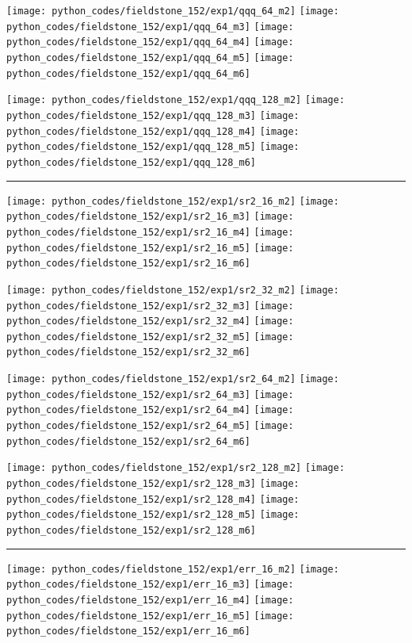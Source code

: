 \noindent
\texttt{[image: python\_codes/fieldstone\_152/exp1/qqq\_64\_m2]}
\texttt{[image: python\_codes/fieldstone\_152/exp1/qqq\_64\_m3]}
\texttt{[image: python\_codes/fieldstone\_152/exp1/qqq\_64\_m4]}
\texttt{[image: python\_codes/fieldstone\_152/exp1/qqq\_64\_m5]}
\texttt{[image: python\_codes/fieldstone\_152/exp1/qqq\_64\_m6]}

\noindent
\texttt{[image: python\_codes/fieldstone\_152/exp1/qqq\_128\_m2]}
\texttt{[image: python\_codes/fieldstone\_152/exp1/qqq\_128\_m3]}
\texttt{[image: python\_codes/fieldstone\_152/exp1/qqq\_128\_m4]}
\texttt{[image: python\_codes/fieldstone\_152/exp1/qqq\_128\_m5]}
\texttt{[image: python\_codes/fieldstone\_152/exp1/qqq\_128\_m6]}

\hrule

\noindent
\texttt{[image: python\_codes/fieldstone\_152/exp1/sr2\_16\_m2]}
\texttt{[image: python\_codes/fieldstone\_152/exp1/sr2\_16\_m3]}
\texttt{[image: python\_codes/fieldstone\_152/exp1/sr2\_16\_m4]}
\texttt{[image: python\_codes/fieldstone\_152/exp1/sr2\_16\_m5]}
\texttt{[image: python\_codes/fieldstone\_152/exp1/sr2\_16\_m6]}

\noindent
\texttt{[image: python\_codes/fieldstone\_152/exp1/sr2\_32\_m2]}
\texttt{[image: python\_codes/fieldstone\_152/exp1/sr2\_32\_m3]}
\texttt{[image: python\_codes/fieldstone\_152/exp1/sr2\_32\_m4]}
\texttt{[image: python\_codes/fieldstone\_152/exp1/sr2\_32\_m5]}
\texttt{[image: python\_codes/fieldstone\_152/exp1/sr2\_32\_m6]}

\noindent
\texttt{[image: python\_codes/fieldstone\_152/exp1/sr2\_64\_m2]}
\texttt{[image: python\_codes/fieldstone\_152/exp1/sr2\_64\_m3]}
\texttt{[image: python\_codes/fieldstone\_152/exp1/sr2\_64\_m4]}
\texttt{[image: python\_codes/fieldstone\_152/exp1/sr2\_64\_m5]}
\texttt{[image: python\_codes/fieldstone\_152/exp1/sr2\_64\_m6]}

\noindent
\texttt{[image: python\_codes/fieldstone\_152/exp1/sr2\_128\_m2]}
\texttt{[image: python\_codes/fieldstone\_152/exp1/sr2\_128\_m3]}
\texttt{[image: python\_codes/fieldstone\_152/exp1/sr2\_128\_m4]}
\texttt{[image: python\_codes/fieldstone\_152/exp1/sr2\_128\_m5]}
\texttt{[image: python\_codes/fieldstone\_152/exp1/sr2\_128\_m6]}

\hrule

\noindent
\texttt{[image: python\_codes/fieldstone\_152/exp1/err\_16\_m2]}
\texttt{[image: python\_codes/fieldstone\_152/exp1/err\_16\_m3]}
\texttt{[image: python\_codes/fieldstone\_152/exp1/err\_16\_m4]}
\texttt{[image: python\_codes/fieldstone\_152/exp1/err\_16\_m5]}
\texttt{[image: python\_codes/fieldstone\_152/exp1/err\_16\_m6]}

